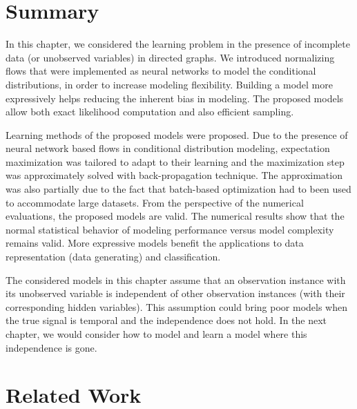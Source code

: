 \section{Summary}
In this chapter, we considered the learning problem in the presence of incomplete data (or unobserved variables) in directed graphs. We introduced normalizing flows that were implemented as neural networks to model the conditional distributions, in order to increase modeling flexibility. Building a model more expressively helps reducing the inherent bias in modeling. The proposed models allow both exact likelihood computation and also efficient sampling.

Learning methods of the proposed models were proposed. Due to the presence of neural network based flows in conditional distribution modeling, expectation maximization was tailored to adapt to their learning and the maximization step was approximately solved with back-propagation technique. The approximation was also partially due to the fact that batch-based optimization had to been used to accommodate large datasets. From the perspective of the numerical evaluations, the proposed models are valid. The numerical results show that the normal statistical behavior of modeling performance versus model complexity remains valid. More expressive models benefit the applications to data representation (data generating) and classification.

The considered models in this chapter assume that an observation instance with its unobserved variable is independent of other observation instances (with their corresponding hidden variables). This assumption could bring poor models when the true signal is temporal and the independence does not hold. In the next chapter, we would consider how to model and learn a model where this independence is gone. 

\section{Related Work}

